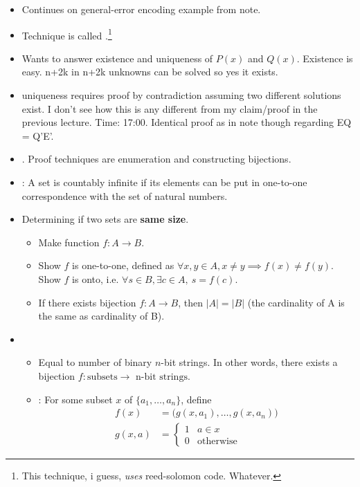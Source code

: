 \documentclass[12pt]{article}
\begin{document}
\begin{itemize}
	\item Continues on general-error encoding example from note. 
	\item Technique is called .\footnote{This technique, i guess, \textit{uses} reed-solomon code. Whatever.}
	
	\item Wants to answer existence and uniqueness of $P(x)$ and $Q(x)$. Existence is easy. n+2k in n+2k unknowns can be solved so yes it exists. 
	
	\item uniqueness requires proof by contradiction assuming two different solutions exist. I don't see how this is any different from my claim/proof in the previous lecture. Time: 17:00. Identical proof as in note though regarding EQ = Q'E'. 
	
	\item {}. Proof techniques are enumeration and constructing bijections. 
	
	\item {}: A set is countably infinite if its elements can be put in one-to-one correspondence with the set of natural numbers. 
	
	\item Determining if two sets are \textbf{same size}. 
	\begin{itemize}
		\item Make function $f: A \rightarrow B$. 
		\item Show $f$ is one-to-one, defined as $\forall x, y \in A, x \ne y \implies f(x) \ne f(y)$. Show $f$ is onto, i.e. $\forall s \in B, \exists c \in A, ~ s = f(c)$. 
		\item {} If there exists bijection $f: A \rightarrow B$, then $|A| = |B|$ (the cardinality of A is the same as cardinality of B). 
	\end{itemize}
	
	\item {} 
	\begin{itemize}
		\item Equal to number of binary $n$-bit strings. In other words, there exists a bijection $f: \text{subsets} \rightarrow \text{ n-bit strings}$. 
		
		\item {}: For some subset $x$ of  $\{a_1, \ldots, a_n\}$, define
		\begin{align}
			f(x) &= \bigg(g(x, a_1), \ldots, g(x, a_n) \bigg) \\
			g(x, a) &= \begin{cases} 1 & a \in x \\ 0 & \text{otherwise} \end{cases}
		\end{align}
		

\end{itemize}
\end{itemize}
\end{document}
